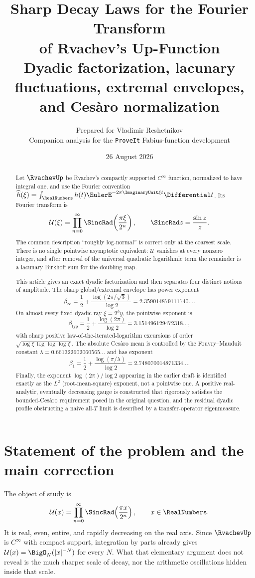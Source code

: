 \documentclass[11pt,oneside]{article}
\title{\bfseries Sharp Decay Laws for the Fourier Transform\\
of Rvachev's Up-Function\\[0.35em]
\large Dyadic factorization, lacunary fluctuations, extremal envelopes, and Ces\`aro normalization}
\author{Prepared for Vladimir Reshetnikov\\
\small Companion analysis for the \texttt{ProveIt} Fabius-function development}
\date{26 August 2026}
\theoremstyle{definition}
\theoremstyle{remark}
\newcommand{\Uhat}{\mathcal U}
\begin{document}
\maketitle

\begin{abstract}
Let $\RvachevUp$ be Rvachev's compactly supported $C^\infty$ function, normalized to have
integral one, and use the Fourier convention
$\widehat h(\xi)=\int_{\RealNumbers}h(t)\EulerE^{-2\pi\ImaginaryUnit\xi t}\Differential t$.  Its Fourier transform is
\[
 \Uhat(\xi)=\prod_{n=0}^{\infty}
 \SincRad\!\left(\frac{\pi\xi}{2^n}\right),
 \qquad \SincRad z=\frac{\sin z}{z}.
\]
The common description ``roughly log-normal'' is correct only at the coarsest scale.
There is no single pointwise asymptotic equivalent: $\Uhat$ vanishes at every nonzero
integer, and after removal of the universal quadratic logarithmic term the remainder is
a lacunary Birkhoff sum for the doubling map.

This article gives an exact dyadic factorization and then separates four distinct notions
of amplitude.  The sharp global/extremal envelope has power exponent
\[
 \beta_\infty=\frac12+\frac{\log(2\pi/\sqrt3)}{\log2}
 =2.359014879111740\ldots .
\]
On almost every fixed dyadic ray $\xi=2^k y$, the pointwise exponent is
\[
 \beta_{\mathrm{typ}}=\frac12+\frac{\log(2\pi)}{\log2}
 =3.151496129472318\ldots ,
\]
with sharp positive law-of-the-iterated-logarithm excursions of order
$\sqrt{\log\xi\,\log\log\log\xi}$.  The absolute Ces\`aro mean is controlled by the
Fouvry--Mauduit constant $\lambda=0.661322602060565\ldots$ and has exponent
\[
 \beta_1=\frac12+\frac{\log(\pi/\lambda)}{\log2}
 =2.748070014871334\ldots .
\]
Finally, the exponent $\log(2\pi)/\log2$ appearing in the earlier draft is identified
exactly as the $L^2$ (root-mean-square) exponent, not a pointwise one.  A positive
real-analytic, eventually decreasing gauge is constructed that rigorously satisfies the
bounded-Ces\`aro requirement posed in the original question, and the residual dyadic
profile obstructing a naive all-$T$ limit is described by a transfer-operator eigenmeasure.
\end{abstract}

\tableofcontents
\newpage

\section{Statement of the problem and the main correction}

The object of study is
\begin{equation}\label{eq:def-U}
 \Uhat(x)=\prod_{n=0}^{\infty}
 \SincRad\!\left(\frac{\pi x}{2^n}\right),
 \qquad x\in\RealNumbers.
\end{equation}
It is real, even, entire, and rapidly decreasing on the real axis.  Since $\RvachevUp$ is
$C^\infty$ with compact support, integration by parts already gives
$\Uhat(x)=\BigO_N(|x|^{-N})$ for every $N$.  What that elementary argument does not
reveal is the much sharper scale of decay, nor the arithmetic oscillations hidden inside
that scale.
\end{document}
